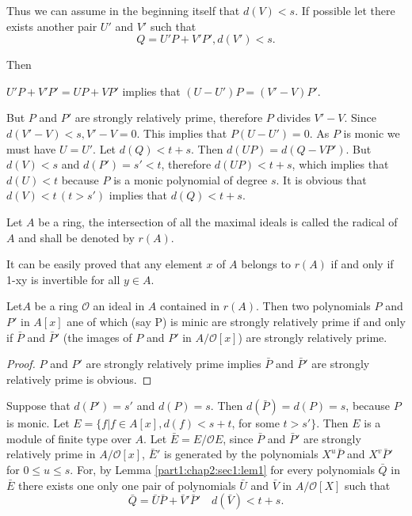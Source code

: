 Thus we can assume in the beginning itself that $d(V) < s$. If possible
let there exists another pair $U'$ and $V'$ such that 
$$
Q=U' P+V' P', d(V')< s.
$$

Then 

$U' P+V' P' = U P +V P'$ implies that $(U -U')P = (V'-V)P'$.

But $P$ and $P'$ are strongly relatively prime, therefore $P$ divides
$V'-V$. Since $d(V' -V)< s, V'-V=0$. This implies that $P(U-U')=0$. As
$P$ is monic we must have $U=U'$. Let $d(Q)< t+s$. Then $d(U P)= d(Q-V
P')$. But $d(V)<s$ and $d(P')= s' <t$, therefore $d(U P)< t+s$, which
implies that $d(U) <t$ because $P$ is a monic polynomial of degree
$s$. It is obvious that $d(V) < t \,(t>s')$ implies that $d(Q)< t+ s$. 

\begin{defi*}%
  Let $A$ be a ring, the intersection of all the maximal ideals  is
  called the radical of $A$ and shall be denoted by $r(A)$. 
\end{defi*} 

 It can be easily proved that any element $x$ of $A$ belongs to $r(A)$
 if and only if 1-xy is invertible for all $y \in A$. 
 
\begin{Lemma}\label{part1:chap2:sec1:lem2}%
  Let\pageoriginale $A$ be a ring $\mathscr{O}$ an ideal in $A$ contained in
  $r(A)$. Then two polynomials $P$ and $P'$ in $A[x]$ ane of which
  (say P) is minic are strongly relatively prime if and only if
  $\bar{P}$ and $\bar{P}'$ (the images of $P$ and $P'$ in $A/
  \mathscr{O}[x]$) are strongly relatively prime. 
\end{Lemma} 
 
\begin{proof}%
  $P$ and $P'$ are strongly relatively prime implies $\bar{P}$ and
  $\bar{P}'$ are stron\-gly relatively prime is obvious. 
\end{proof} 
 
Suppose that $d(P')=s'$ and $d(P)=s$. Then $d(\bar{P})=d (P)=s$,
because $P$ is monic. Let $E= \{f | f \in A [x], d(f) < s+t$, for
  some $t> s' \}$. Then $E$ is a module of finite type over $A$. Let
$\bar{E}= E/ \mathscr{O} E$, since $\bar{P}$ and ${\bar{P}}'$ are
strongly relatively prime in $A/ \mathscr{O}[x]$, $\bar{E}'$ is
generated by the polynomials $X^u \bar{P}$ and $X^v \bar{P}'$ for $0
\leq u \leq s$. For, by Lemma \ref{part1:chap2:sec1:lem1} for every
polynomials $\bar{Q}$ in 
$\bar{E}$ there exists  one only one pair of polynomials $\bar{U}$ and
$\bar{V}$ in $A / \mathscr{O}[X]$ such that 
$$
\bar{Q} = \bar{U} \bar{P} +\bar{V}' \bar{P}' \quad d(\bar{V})< t +s.
$$
 
